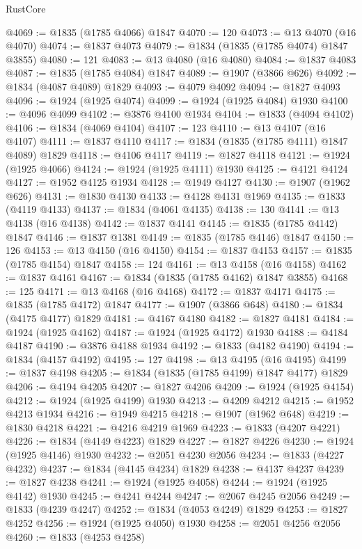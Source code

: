 \begin{lexlean}{RustCore}
\begin{coremodule}
@4069 := @1835 (@1785 @4066) @1847
@4070 := 120
@4073 := @13 @4070 (@16 @4070)
@4074 := @1837 @4073
@4079 := @1834 (@1835 (@1785 @4074) @1847 @3855)
@4080 := 121
@4083 := @13 @4080 (@16 @4080)
@4084 := @1837 @4083
@4087 := @1835 (@1785 @4084) @1847
@4089 := @1907 (@3866 @626)
@4092 := @1834 (@4087 @4089) @1829
@4093 := @4079 @4092
@4094 := @1827 @4093
@4096 := @1924 (@1925 @4074)
@4099 := @1924 (@1925 @4084) @1930
@4100 := @4096 @4099
@4102 := @3876 @4100 @1934
@4104 := @1833 (@4094 @4102)
@4106 := @1834 (@4069 @4104)
@4107 := 123
@4110 := @13 @4107 (@16 @4107)
@4111 := @1837 @4110
@4117 := @1834 (@1835 (@1785 @4111) @1847 @4089) @1829
@4118 := @4106 @4117
@4119 := @1827 @4118
@4121 := @1924 (@1925 @4066)
@4124 := @1924 (@1925 @4111) @1930
@4125 := @4121 @4124
@4127 := @1952 @4125 @1934
@4128 := @1949 @4127
@4130 := @1907 (@1962 @626)
@4131 := @1830 @4130
@4133 := @4128 @4131 @1969
@4135 := @1833 (@4119 @4133)
@4137 := @1834 (@4061 @4135)
@4138 := 130
@4141 := @13 @4138 (@16 @4138)
@4142 := @1837 @4141
@4145 := @1835 (@1785 @4142) @1847
@4146 := @1837 @1381
@4149 := @1835 (@1785 @4146) @1847
@4150 := 126
@4153 := @13 @4150 (@16 @4150)
@4154 := @1837 @4153
@4157 := @1835 (@1785 @4154) @1847
@4158 := 124
@4161 := @13 @4158 (@16 @4158)
@4162 := @1837 @4161
@4167 := @1834 (@1835 (@1785 @4162) @1847 @3855)
@4168 := 125
@4171 := @13 @4168 (@16 @4168)
@4172 := @1837 @4171
@4175 := @1835 (@1785 @4172) @1847
@4177 := @1907 (@3866 @648)
@4180 := @1834 (@4175 @4177) @1829
@4181 := @4167 @4180
@4182 := @1827 @4181
@4184 := @1924 (@1925 @4162)
@4187 := @1924 (@1925 @4172) @1930
@4188 := @4184 @4187
@4190 := @3876 @4188 @1934
@4192 := @1833 (@4182 @4190)
@4194 := @1834 (@4157 @4192)
@4195 := 127
@4198 := @13 @4195 (@16 @4195)
@4199 := @1837 @4198
@4205 := @1834 (@1835 (@1785 @4199) @1847 @4177) @1829
@4206 := @4194 @4205
@4207 := @1827 @4206
@4209 := @1924 (@1925 @4154)
@4212 := @1924 (@1925 @4199) @1930
@4213 := @4209 @4212
@4215 := @1952 @4213 @1934
@4216 := @1949 @4215
@4218 := @1907 (@1962 @648)
@4219 := @1830 @4218
@4221 := @4216 @4219 @1969
@4223 := @1833 (@4207 @4221)
@4226 := @1834 (@4149 @4223) @1829
@4227 := @1827 @4226
@4230 := @1924 (@1925 @4146) @1930
@4232 := @2051 @4230 @2056
@4234 := @1833 (@4227 @4232)
@4237 := @1834 (@4145 @4234) @1829
@4238 := @4137 @4237
@4239 := @1827 @4238
@4241 := @1924 (@1925 @4058)
@4244 := @1924 (@1925 @4142) @1930
@4245 := @4241 @4244
@4247 := @2067 @4245 @2056
@4249 := @1833 (@4239 @4247)
@4252 := @1834 (@4053 @4249) @1829
@4253 := @1827 @4252
@4256 := @1924 (@1925 @4050) @1930
@4258 := @2051 @4256 @2056
@4260 := @1833 (@4253 @4258)

\end{coremodule}
\end{lexlean}
